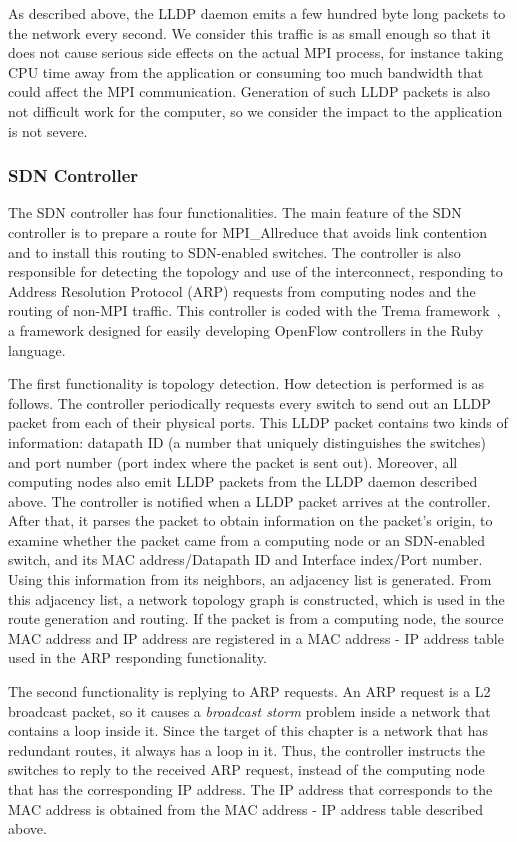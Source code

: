 As described above, the LLDP daemon emits a few hundred byte long
packets to the network every second. We consider this traffic is as
small enough so that it does not cause serious side effects on the
actual MPI process, for instance taking CPU time away from the
application or consuming too much bandwidth that could affect the MPI
communication. Generation of such LLDP packets is also not difficult
work for the computer, so we consider the impact to the application is
not severe.

\subsubsection{SDN Controller}

The SDN controller has four functionalities. The main feature of the SDN
controller is to prepare a route for MPI\_Allreduce that avoids
link contention and to install this routing to SDN-enabled switches. The
controller is also responsible for detecting the topology and use of the
interconnect, responding to Address Resolution Protocol (ARP) requests
from computing nodes and the routing of non-MPI traffic. This controller
is coded with the Trema framework~\autocite{trema}, a framework designed for
easily developing OpenFlow controllers in the Ruby~\autocite{ruby} language.

The first functionality is topology detection. How detection is
performed is as follows. The controller periodically requests every
switch to send out an LLDP packet from each of their physical ports.
This LLDP packet contains two kinds of information: datapath ID (a
number that uniquely distinguishes the switches) and port number (port
index where the packet is sent out). Moreover, all computing nodes also
emit LLDP packets from the LLDP daemon described above. The controller
is notified when a LLDP packet arrives at the controller. After that, it
parses the packet to obtain information on the packet's origin, to
examine whether the packet came from a computing node or an SDN-enabled
switch, and its MAC address/Datapath ID and Interface index/Port number.
Using this information from its neighbors, an adjacency list is
generated. From this adjacency list, a network topology graph is
constructed, which is used in the route generation and routing. If the
packet is from a computing node, the source MAC address and IP address
are registered in a MAC address - IP address table used in the ARP
responding functionality.

The second functionality is replying to ARP requests. An ARP request is
a L2 broadcast packet, so it causes a \emph{broadcast storm} problem
inside a network that contains a loop inside it. Since the target of
this chapter is a network that has redundant routes, it always has a loop
in it. Thus, the controller instructs the switches to reply to the
received ARP request, instead of the computing node that has the
corresponding IP address. The IP address that corresponds to the MAC
address is obtained from the MAC address - IP address table described
above.

